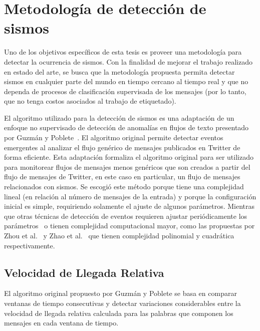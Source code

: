 \section{Metodología de detección de sismos}
\label{sec:deteccion}

Uno de los objetivos específicos de esta tesis es proveer una metodología para detectar la ocurrencia de sismos. 
%
Con la finalidad de mejorar el trabajo realizado en estado del arte, se busca que la metodología propuesta permita detectar sismos en cualquier parte del mundo en tiempo cercano al tiempo real y que no dependa de procesos de clasificación supervisada de los mensajes (por lo tanto, que no tenga costos asociados al trabajo de etiquetado). 


El algoritmo utilizado para la detección de sismos es una adaptación de un enfoque no supervisado de detección de anomalías en flujos de texto presentado por Guzmán y Poblete~\cite{guzman2013line}. 
%
El algoritmo original permite detectar eventos emergentes al analizar el flujo genérico de mensajes publicados en Twitter de forma eficiente.  
%
Esta adaptación formaliza el algoritmo original para ser utilizado para monitorear 
flujos de mensajes menos genéricos que son creados a partir del flujo de mensajes de Twitter, en este caso en particular, un flujo de mensajes relacionados con sismos.
%
Se escogió este método porque tiene una complejidad lineal (en relación al número de mensajes de la entrada) y porque la configuración inicial es simple, requiriendo solamente el ajuste de algunos parámetros.
%
Mientras que otras técnicas de detección de eventos requieren ajustar periódicamente los parámetros~\cite{mathioudakis2010twittermonitor,sankaranarayanan2009twitterstand} o tienen complejidad computacional mayor, como las propuestas por Zhou et al.~\cite{zhou2015unsupervised} y Zhao et al.~\cite{zhao2014unsupervised} que tienen complejidad polinomial y cuadrática respectivamente. 


\subsection{Velocidad de Llegada Relativa}

El algoritmo original propuesto por Guzmán y Poblete se basa en comparar ventanas de tiempo consecutivas y detectar variaciones considerables entre la velocidad de llegada relativa calculada para las palabras que componen los mensajes en cada ventana de tiempo.

